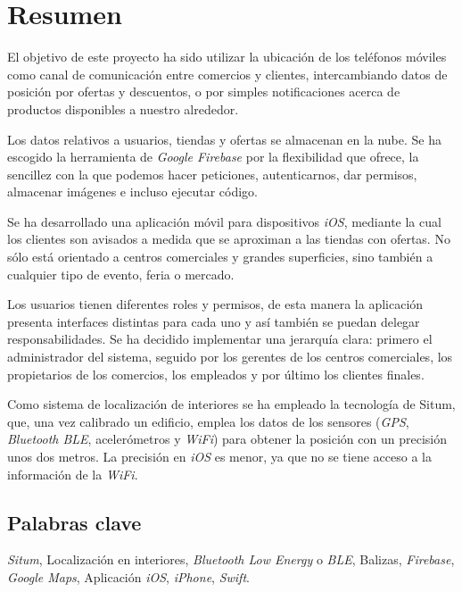 \chapter*{Resumen}
El objetivo de este proyecto ha sido utilizar la ubicación de los teléfonos móviles como canal de comunicación entre comercios y clientes, intercambiando datos de posición por ofertas y descuentos, o por simples notificaciones acerca de productos disponibles a nuestro alrededor.

Los datos relativos a usuarios, tiendas y ofertas se almacenan en la nube. Se ha escogido la herramienta de \textit{Google Firebase} por la flexibilidad que ofrece, la sencillez con la que podemos hacer peticiones, autenticarnos, dar permisos, almacenar imágenes e incluso ejecutar código.

Se ha desarrollado una aplicación móvil para dispositivos \textit{iOS}, mediante la cual los clientes son avisados a medida que se aproximan a las tiendas con ofertas. No sólo está orientado a centros comerciales y grandes superficies, sino también a cualquier tipo de evento, feria o mercado.

Los usuarios tienen diferentes roles y permisos, de esta manera la aplicación presenta interfaces distintas para cada uno y así también se puedan delegar responsabilidades. Se ha decidido implementar una jerarquía clara: primero el administrador del sistema, seguido por los gerentes de los centros comerciales,  los propietarios de los comercios, los empleados y por último los clientes finales.

Como sistema de localización de interiores se ha empleado la tecnología de Situm, que, una vez calibrado un edificio, emplea los datos de los sensores (\textit{GPS}, \textit{Bluetooth BLE}, acelerómetros y \textit{WiFi}) para obtener la posición con un precisión unos dos metros. La precisión en \textit{iOS} es menor, ya que no se tiene acceso a la información de la \textit{WiFi}.
\section*{Palabras clave}
\textit{Situm}, Localización en interiores, \textit{Bluetooth Low Energy} o \textit{BLE}, Balizas, \textit{Firebase}, \textit{Google Maps}, Aplicación \textit{iOS}, \textit{iPhone}, \textit{Swift}.